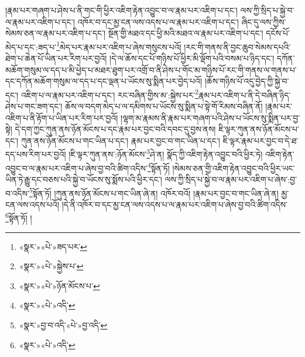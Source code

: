 །རྣམ་པར་གཞག་པ་ཤེས་པ་ནི་གང་གི་ཕྱིར་འཇིག་རྟེན་འབྱུང་བ་ལ་རྣམ་པར་འཇིག་པ་དང་། ལས་ཀྱི་སྲིད་པ་སྐྱེ་བ་ལ་རྣམ་པར་འཇིག་པ་དང་། འཁོར་བ་དང་མྱ་ངན་ལས་འདས་པ་ལ་རྣམ་པར་འཇིག་པ་དང་། ཞིང་དུ་ལས་ཀྱིས་སེམས་ཅན་ལ་རྣམ་པར་འཇིག་པ་དང་། སྔོན་གྱི་མཐའ་དང་ཕྱི་མའི་མཐའ་ལ་རྣམ་པར་འཇིག་པ་དང་། དངོས་པོ་མེད་པ་དང་:ཟད་པ་\footnote{«སྣར་»«པེ་»ཟད་པར་}མེད་པར་རྣམ་པར་འཇིག་པ་ཞེས་གསུངས་པའོ། །རང་གི་གནས་ནི་བྱང་ཆུབ་སེམས་དཔའི་ཐེག་པ་ཆེན་པོ་ཡིན་པར་རིག་པར་བྱའོ། །དེ་ལ་ཆོས་དང་པོ་གཉིས་པོ་ཕྱིར་མི་ལྡོག་པའི་བསམ་པ་ཉིད་དང་། དཀོན་མཆོག་གསུམ་ལ་དད་པ་མི་ཕྱེད་པ་མཐར་ཐུག་པར་འགྲོ་བ་ནི་ཤེས་པ་གོང་མ་གཉིས་པོ་རང་གི་གནས་ལ་གནས་པ་དང་དཀོན་མཆོག་གསུམ་ལ་དད་པ་དང་ལྡན་པ་ཡོངས་སུ་སྨིན་པར་བྱེད་པའོ། །ཆོས་གཉིས་པོ་འདུ་བྱེད་ཀྱི་སྐྱེ་བ་དང་། འཇིག་པ་ལ་རྣམ་པར་འཇིག་པ་དང་། རང་བཞིན་གྱིས་མ་:སྐྱེས་པར་\footnote{«སྣར་»«པེ་»སྐྱེས་པ་}རྣམ་པར་འཇིག་པ་ནི་དེ་བཞིན་ཉིད་ཤེས་པ་གང་ཟག་དང་། ཆོས་ལ་བདག་མེད་པ་ལ་དམིགས་པ་ཡོངས་སུ་སྨིན་པ་སྟེ་གོ་རིམས་བཞིན་ནོ། །རྣམ་པར་འཇིག་པ་ནི་རྟོག་པ་ཡིན་པར་རིག་པར་བྱའོ། །ལྷག་མ་རྣམས་ནི་རྣམ་པར་གཞག་པའི་ཤེས་པ་ཡོངས་སུ་སྨིན་པར་བྱ་སྟེ། དེ་དག་ཀྱང་ཀུན་ནས་ཉོན་མོངས་པ་དང་རྣམ་པར་བྱང་བའི་དབང་དུ་བྱས་ནས། ཇི་ལྟར་ཀུན་ནས་ཉོན་མོངས་པ་དང་། ཀུན་ནས་ཉོན་མོངས་པ་གང་ཡིན་པ་དང་། རྣམ་པར་བྱང་བ་གང་ཡིན་པ་དང་། ཇི་ལྟར་རྣམ་པར་བྱང་བ་དེ་ཐ་དད་པས་རིག་པར་བྱའོ། །ཇི་ལྟར་ཀུན་ནས་:ཉོན་མོངས་\footnote{«སྣར་»«པེ་»ཉོན་མོངས་པ་}ཤེ་ན། སྣོད་ཀྱི་འཇིག་རྟེན་འབྱུང་བའི་ཕྱིར་ཏེ། འཇིག་རྟེན་འབྱུང་བ་ལ་རྣམ་པར་འཇིག་པ་ཞེས་བྱ་བའི་ཚིག་འདིས་\footnote{«སྣར་»«པེ་»འདི་}སྟོན་ཏོ། །སེམས་ཅན་གྱི་འཇིག་རྟེན་འབྱུང་བའི་ཕྱིར་ཡང་ཡིན་ཏེ་རྒྱུ་དང་བཅས་པའི་སྐྱེ་བ་ཡོངས་སུ་སྨོས་པའི་ཕྱིར་དང་། ལས་ཀྱི་སྲིད་པ་སྐྱེ་བ་ལ་རྣམ་པར་འཇིག་པ་ཞེས་:བྱ་བ་འདིས་\footnote{«སྣར་»བྱ་བ་འདི་«པེ་»བྱ་འདི་}སྟོན་ཏོ། །ཀུན་ནས་ཉོན་མོངས་པ་གང་ཡིན་ཞེ་ན། འཁོར་བའོ། །རྣམ་པར་བྱང་བ་གང་ཡིན་ཞེ་ན། མྱ་ངན་ལས་འདས་པའོ། །དེ་ནི་འཁོར་བ་དང་མྱ་ངན་ལས་འདས་པ་ལ་རྣམ་པར་འཇིག་པ་ཞེས་བྱ་བའི་ཚིག་འདིས་\footnote{«སྣར་»«པེ་»འདི་}སྟོན་ཏོ། །
